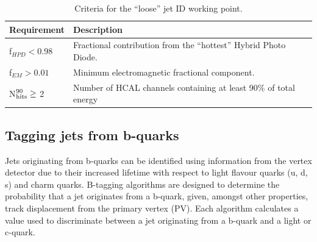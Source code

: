 \begin{table}[!ht]
  \caption{Criteria for the ``loose'' jet ID working point.\label{tab:jet_id_loose}}
  \footnotesize
  \begin{center}
    \begin{tabular}{ll}
      \hline
      \hline
      Requirement                & Description                                                      \\
      \hline
      f$_{HPD} < 0.98$           & Fractional contribution from the ``hottest'' Hybrid Photo Diode. \\
      f$_{EM} > 0.01$            & Minimum electromagnetic fractional component.                    \\
      N$^{90}_{\rm hits} \geq$ 2 & Number of HCAL channels containing at least
      90\% of total energy      \\
      \hline
      \hline
    \end{tabular}
  \end{center}
\end{table}


\subsection{Tagging jets from b-quarks}

Jets originating from b-quarks can be identified using information from the 
vertex detector due to their increased lifetime with respect to light
flavour quarks (u, d, s) and charm quarks. 
B-tagging algorithms are designed to determine the probability that a jet 
originates from a b-quark, given, amongst other properties, track
displacement from the primary vertex (PV). Each algorithm
calculates a value used to discriminate between a jet originating from a
b-quark and a light or c-quark.


